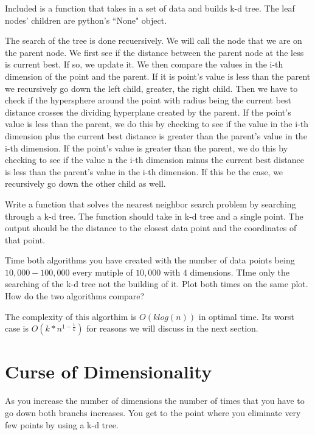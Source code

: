 Included is a function that takes in a set of data and builds k-d tree. The leaf nodes' children are  python's ``None" object.

The search of the tree is done recuersively. We will call the node that we are on the parent node. We first see if the distance between the parent node at the less is current best. If so, we update it. We then compare the values in the i-th dimension of the point and the parent. If it is point's value is less than the parent we recursively go down the left child, greater, the right child. Then we have to check if the hypersphere around the point with radius being the current best distance crosses the dividing hyperplane created by the parent. If the point's value is less than the parent, we do this by checking to see if the value in the i-th dimension plus the current best distance is greater than the parent's value in the i-th dimension. If the point's value is greater than the parent, we do this by checking to see if the value n the i-th dimension minus the current best distance is less than the parent's value in the i-th dimension. If this be the case, we recursively go down the other child as well.

\begin{problem}
Write a function that solves the nearest neighbor search problem by searching through a k-d tree. The function should take in k-d tree and a single point. The output should be the distance to the closest data point and the coordinates of that point. 
\end{problem}

\begin{problem}
Time both algorithms you have created with the number of data points being $10,000-100,000$ every mutiple of $10,000$ with $4$ dimensions. TIme only the searching of the k-d tree not the building of it. Plot both times on the same plot. How do the two algorithms compare?
\end{problem}

The complexity of this algorthim is $O(klog(n))$ in optimal time. Its worst case is $O(k*n^{1-\frac{1}{k}})$ for reasons we will discuss in the next section.

\section*{Curse of Dimensionality}

As you increase the number of dimensions the number of times that you have to go down both branchs increases. You get to the point where you eliminate very few points by using a k-d tree.

